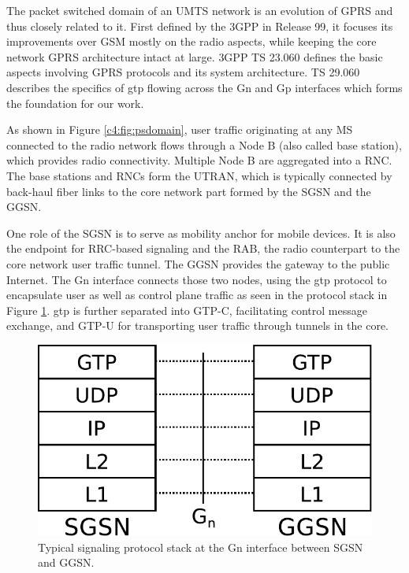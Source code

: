 The packet switched domain of an \gls{UMTS} network is an evolution of \gls{GPRS} and thus closely related to it. First defined by the \gls{3GPP} in Release 99, it focuses its improvements over \gls{GSM} mostly on the radio aspects, while keeping the core network \gls{GPRS} architecture intact at large. \gls{3GPP} \gls{TS} 23.060 \cite{3gpp.23.060} defines the basic aspects involving \gls{GPRS} protocols and its system architecture. \gls{TS} 29.060 \cite{3gpp.29.060} describes the specifics of \gls{gtp} flowing across the Gn and Gp interfaces which forms the foundation for our work.



As shown in Figure \ref{c4:fig:psdomain}, user traffic originating at any \gls{MS} connected to the radio network flows through a Node B (also called base station), which provides radio connectivity. Multiple Node B are aggregated into a \gls{RNC}. The base stations and \glspl{RNC} form the \gls{UTRAN}, which is typically connected by back-haul fiber links to the core network part formed by the \gls{SGSN} and the \gls{GGSN}.

One role of the \gls{SGSN} is to serve as mobility anchor for mobile devices. It is also the endpoint for \gls{RRC}-based signaling and the \gls{RAB}, the radio counterpart to the core network user traffic tunnel. The \gls{GGSN} provides the gateway to the public Internet. The Gn interface connects those two nodes, using the \gls{gtp} protocol to encapsulate user as well as control plane traffic as seen in the protocol stack in Figure \ref{c4:fig:signallingstack}. \gls{gtp} is further separated into GTP-C, facilitating control message exchange, and GTP-U for transporting user traffic through tunnels in the core.

\begin{figure}[htb]
	\centering
	\includegraphics[width=0.6\columnwidth]{images/signalling-stack.pdf}
	\caption{Typical signaling protocol stack at the Gn interface between \gls{SGSN} and \gls{GGSN}.}
	\label{c4:fig:signallingstack}
\end{figure}



